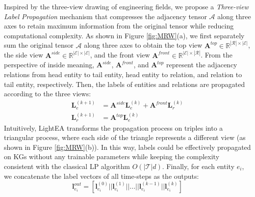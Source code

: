 \documentclass[11pt]{article}
\begin{document}
Inspired by the three-view drawing of engineering fields, we propose a \emph{Three-view Label Propagation} mechanism that compresses the adjacency tensor $\boldsymbol{\mathcal{A}}$ along three axes to retain maximum information from the original tensor while reducing computational complexity.
As shown in Figure \ref{fig:MRW}(a), we first separately sum the original tensor $\boldsymbol{\mathcal{A}}$ along three axes to obtain the top view $\bm A^{top}\in\mathbb{R}^{|\mathcal{R}|\times|\mathcal{E}|}$, the side view $\bm A^{side}\in\mathbb{R}^{|\mathcal{E}|\times|\mathcal{E}|}$, and the front view $\bm A^{front}\in\mathbb{R}^{|\mathcal{E}|\times|\mathcal{R}|}$.
From the perspective of inside meaning, $\bm A^{side}$, $\bm A^{front}$, and $\bm A^{top}$ represent the adjacency relations from head entity to tail entity, head entity to relation, and relation to tail entity, respectively.
Then, the labels of entities and relations are propagated according to the three views:
\begin{align}
  \bm L^{(k+1)}_e &= \bm A^{side} \bm L^{(k)}_e + \bm A^{front} \bm L^{(k)}_r\\
  \bm L^{(k+1)}_r &= \bm A^{top} \bm L^{(k)}_e
\end{align}
Intuitively, LightEA transforms the propagation process on triples into a triangular process, where each side of the triangle represents a different view (as shown in Figure \ref{fig:MRW}(b)).
In this way, labels could be effectively propagated on KGs without any trainable parameters while keeping the complexity consistent with the classical LP algorithm $O(|\mathcal{T}|d)$.
Finally, for each entity $e_i$, we concatenate the label vectors of all time-steps as the outputs:
\begin{equation}
    \bm l^{out}_{e_i} = \left[\bm l^{(0)}_{e_i}||\bm l^{(1)}_{e_i}||...||\bm l^{(k-1)}_{e_i}||\bm l^{(k)}_{e_i}\right]
\end{equation}
\end{document}
